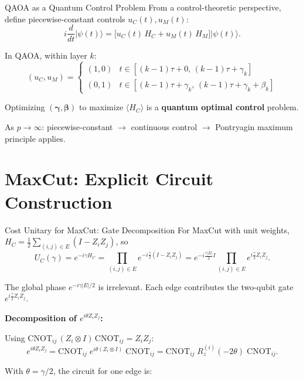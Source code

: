\documentclass{beamer}
\begin{document}
\begin{frame}
\begin{frame}{QAOA as a Quantum Control Problem}
From a control-theoretic perspective, define piecewise-constant
controls $u_C(t), u_M(t)$:
\[
i\frac{d}{dt}|\psi(t)\rangle
= \bigl[u_C(t)\,H_C + u_M(t)\,H_M\bigr]|\psi(t)\rangle.
\]

In QAOA, within layer $k$:
\[
(u_C,u_M) = \begin{cases}
(1,0) & t\in[(k-1)\tau + 0,\,(k-1)\tau+\gamma_k] \\
(0,1) & t\in[(k-1)\tau + \gamma_k,\,(k-1)\tau+\gamma_k+\beta_k]
\end{cases}
\]

Optimizing $(\boldsymbol{\gamma},\boldsymbol{\beta})$ to maximize
$\langle H_C\rangle$ is a \textbf{quantum optimal control} problem.

\medskip

As $p\to\infty$:  piecewise-constant $\to$ continuous control
$\to$ Pontryagin maximum principle applies.
\end{frame}


\section{MaxCut: Explicit Circuit Construction}

\begin{frame}{Cost Unitary for MaxCut: Gate Decomposition}
For MaxCut with unit weights,
$H_C = \tfrac{1}{2}\sum_{(i,j)\in E}(I - Z_iZ_j)$, so
\[
U_C(\gamma)
= e^{-i\gamma H_C}
= \prod_{(i,j)\in E} e^{-i\frac{\gamma}{2}(I - Z_iZ_j)}
= e^{-i\frac{\gamma|E|}{2}I}
  \prod_{(i,j)\in E} e^{i\frac{\gamma}{2}Z_iZ_j}.
\]

The global phase $e^{-i\gamma|E|/2}$ is irrelevant. Each edge
contributes the two-qubit gate $e^{i\frac{\gamma}{2}Z_iZ_j}$.

\medskip

\textbf{Decomposition of $e^{i\theta Z_i Z_j}$:}

Using $\mathrm{CNOT}_{ij}\,(Z_i\otimes I)\,\mathrm{CNOT}_{ij} = Z_i Z_j$:
\[
e^{i\theta Z_iZ_j}
= \mathrm{CNOT}_{ij}\;
e^{i\theta(Z_i\otimes I)}\;
\mathrm{CNOT}_{ij}
= \mathrm{CNOT}_{ij}\;R_z^{(i)}(-2\theta)\;\mathrm{CNOT}_{ij}.
\]

With $\theta = \gamma/2$, the circuit for one edge is:
\end{frame}



\end{frame}
\end{document}
